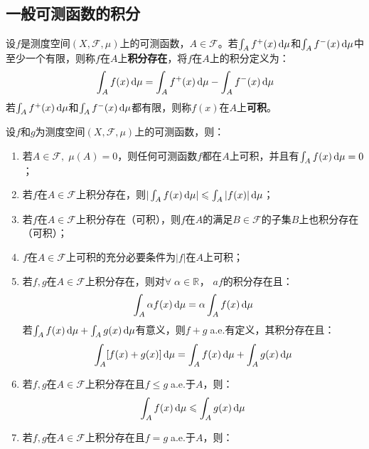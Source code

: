 \subsection{一般可测函数的积分}
\begin{definition}
	设$f$是测度空间$(X,\mathscr{F},\mu)$上的可测函数，$A\in \mathscr{F}$。若$\int_{A}f^+(x)\mathop{}\!\mathrm{d}\mu$和$\int_{A}f^-(x)\mathop{}\!\mathrm{d}\mu$中至少一个有限，则称$f$在$A$上\textbf{积分存在}，将$f$在$A$上的积分定义为：
	\begin{equation*}
		\int_{A}f(x)\mathop{}\!\mathrm{d}\mu=\int_{A}f^+(x)\mathop{}\!\mathrm{d}\mu-\int_{A}f^-(x)\mathop{}\!\mathrm{d}\mu
	\end{equation*}
	若$\int_{A}f^+(x)\mathop{}\!\mathrm{d}\mu$和$\int_{A}f^-(x)\mathop{}\!\mathrm{d}\mu$都有限，则称$f(x)$在$A$上\textbf{可积}。
\end{definition}
\begin{property}\label{prop:MeasurableIntegral}
	设$f$和$g$为测度空间$(X,\mathscr{F},\mu)$上的可测函数，则：
	\begin{enumerate}
		\item 若$A\in \mathscr{F},\;\mu(A)=0$，则任何可测函数$f$都在$A$上可积，并且有$\int_{A}f(x)\mathop{}\!\mathrm{d}\mu=0$；
		\item 若$f$在$A\in \mathscr{F}$上积分存在，则$|\int_{A}^{}f(x)\mathop{}\!\mathrm{d}\mu|\leqslant\int_{A}^{}|f(x)|\mathop{}\!\mathrm{d}\mu$；
		\item 若$f$在$A\in \mathscr{F}$上积分存在（可积），则$f$在$A$的满足$B\in\mathscr{F}$的子集$B$上也积分存在（可积）；
		\item $f$在$A\in \mathscr{F}$上可积的充分必要条件为$|f|$在$A$上可积；
		\item 若$f,g$在$A\in \mathscr{F}$上积分存在，则对$\forall\;\alpha\in\mathbb{R}^{}$， $af$的积分存在且：
		\begin{equation*}
			\int_{A}\alpha f(x)\mathop{}\!\mathrm{d}\mu=\alpha\int_{A}f(x)\mathop{}\!\mathrm{d}\mu
		\end{equation*}
		若$\int_{A}f(x)\mathop{}\!\mathrm{d}\mu+\int_{A}g(x)\mathop{}\!\mathrm{d}\mu$有意义，则$f+g\;$a.e.有定义，其积分存在且：
		\begin{equation*}
			\int_{A}^{}[f(x)+g(x)]\mathop{}\!\mathrm{d}\mu=\int_{A}^{}f(x)\mathop{}\!\mathrm{d}\mu+\int_{A}^{}g(x)\mathop{}\!\mathrm{d}\mu
		\end{equation*}
		\item 若$f,g$在$A\in\mathscr{F}$上积分存在且$f\leqslant g\;$a.e.于$A$，则：
		\begin{equation*}
			\int_{A}^{}f(x)\mathop{}\!\mathrm{d}\mu\leqslant\int_{A}^{}g(x)\mathop{}\!\mathrm{d}\mu
		\end{equation*}
		\item 若$f,g$在$A\in\mathscr{F}$上积分存在且$f=g\;$a.e.于$A$，则：
		\begin{equation*}

\end{equation*}
\end{enumerate}
\end{property}

